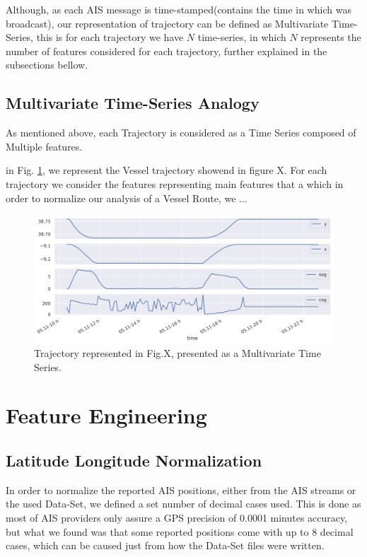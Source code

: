 Although, as each AIS message is time-stamped(contains the time in which was broadcast), our representation of trajectory can be defined as Multivariate Time-Series, this is for each trajectory we have $N$ time-series, in which $N$ represents the number of features considered for each trajectory, further explained in the subsections bellow.

\subsection{Multivariate Time-Series Analogy}
As mentioned above, each Trajectory is considered as a Time Series composed of Multiple features.  

in Fig. \ref{fig: MTimeSeries_example}, we represent the Vessel trajectory showend in figure X. 
For each trajectory we consider the features representing 
main features that a which in order to normalize our analysis of a Vessel Route, we ...

\begin{figure}[H]
	\centering
	\includegraphics[scale = .5]{figures/Ch3/ts_example.png}
    \caption{Trajectory represented in Fig.X, presented as a Multivariate Time Series.}
    \label{fig: MTimeSeries_example}
\end{figure}


\section{Feature Engineering}
\subsection{Latitude Longitude Normalization}
In order to normalize the reported AIS positions, either from the AIS streams or the used Data-Set, we defined a set number of decimal cases used. This is done as most of AIS providers only assure a GPS precision of 0.0001 minutes accuracy, but what we found was that some reported positions come with up to 8 decimal cases, which can be caused just from how the Data-Set files were written.

